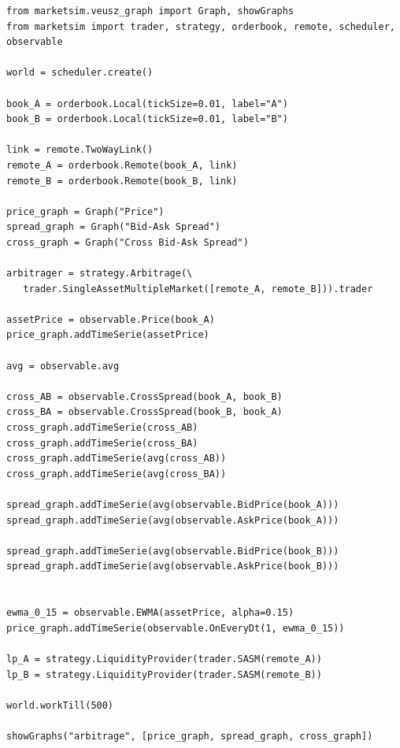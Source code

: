 \documentclass[a4paper,11pt]{article}
\begin{document}
\begin{verbatim}
from marketsim.veusz_graph import Graph, showGraphs
from marketsim import trader, strategy, orderbook, remote, scheduler, observable

world = scheduler.create()

book_A = orderbook.Local(tickSize=0.01, label="A")
book_B = orderbook.Local(tickSize=0.01, label="B")

link = remote.TwoWayLink()
remote_A = orderbook.Remote(book_A, link)
remote_B = orderbook.Remote(book_B, link)

price_graph = Graph("Price")
spread_graph = Graph("Bid-Ask Spread")
cross_graph = Graph("Cross Bid-Ask Spread")

arbitrager = strategy.Arbitrage(\
   trader.SingleAssetMultipleMarket([remote_A, remote_B])).trader
 
assetPrice = observable.Price(book_A)
price_graph.addTimeSerie(assetPrice)

avg = observable.avg

cross_AB = observable.CrossSpread(book_A, book_B)
cross_BA = observable.CrossSpread(book_B, book_A)
cross_graph.addTimeSerie(cross_AB)
cross_graph.addTimeSerie(cross_BA)
cross_graph.addTimeSerie(avg(cross_AB))
cross_graph.addTimeSerie(avg(cross_BA))

spread_graph.addTimeSerie(avg(observable.BidPrice(book_A)))
spread_graph.addTimeSerie(avg(observable.AskPrice(book_A)))

spread_graph.addTimeSerie(avg(observable.BidPrice(book_B)))
spread_graph.addTimeSerie(avg(observable.AskPrice(book_B)))


ewma_0_15 = observable.EWMA(assetPrice, alpha=0.15)
price_graph.addTimeSerie(observable.OnEveryDt(1, ewma_0_15))

lp_A = strategy.LiquidityProvider(trader.SASM(remote_A))
lp_B = strategy.LiquidityProvider(trader.SASM(remote_B))

world.workTill(500)

showGraphs("arbitrage", [price_graph, spread_graph, cross_graph])
\end{verbatim}
\end{document}
